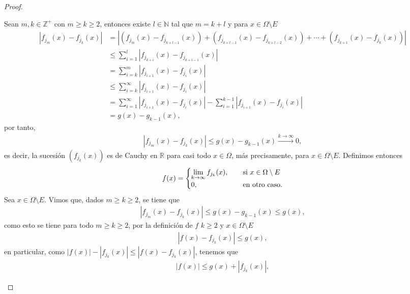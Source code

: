 \begin{proof}
\begin{itemize}
        Sean $m,k\in \mathbb{Z}^+$ con $m\geq k\geq2$, entonces existe $l\in \mathbb{N}$ tal que $m=k+l$ y para $x \in \Omega\setminus E$
        \begin{align*}
            |f_{j_m}(x)-f_{j_k}(x)|&=|(f_{j_m}(x)-f_{j_{k+l-1}}(x))+(f_{j_{k+l-1}}(x)-f_{j_{k+l-2}}(x))+\dotsb+(f_{j_{k+1}}(x)-f_{j_{k}}(x))|\\
            &\leq\sum_{i=1}^l|f_{j_{k+i}}(x)-f_{j_{k+i-1}}(x)|\\
            &=\sum_{i=k}^{m}|f_{j_{i+1}}(x)-f_{j_i}(x)|\\
            &\leq \sum_{i=k}^\infty |f_{j_{i+1}}(x)-f_{j_i}(x)|\\
            &=\sum_{i=1}^\infty |f_{j_{i+1}}(x)-f_{j_i}(x)|-\sum_{i=1}^{k-1} |f_{j_{i+1}}(x)-f_{j_i}(x)|\\
            &=g(x)-g_{k-1}(x), 
        \end{align*}
        por tanto, 
        \begin{align*}
            |f_{j_m}(x)-f_{j_k}(x)|\leq g(x)-g_{k-1}(x)\xrightarrow{k\to \infty}0,
        \end{align*}
        es decir, la sucesión $(f_{j_k}(x))$ es de Cauchy en $\mathbb{R}$ para casi todo $x \in \Omega$, más precisamente, para $x \in \Omega \setminus E$. Definimos entonces
        \begin{align*}
            f(x)=\begin{cases}
                \displaystyle\lim_{k\to \infty}f_{j_k}(x), \hspace{3mm} &\text{ si } x\in \Omega\setminus E\\
                0, &\text{ en otro caso.}
            \end{cases}
        \end{align*}
        Sea $x \in \Omega\setminus E$. Vimos que, dados $m\geq k\geq 2$, se tiene que
        \begin{align*}
            |f_{j_m}(x)-f_{j_k}(x)|\leq g(x)-g_{k-1}(x)\leq g(x),
        \end{align*}
        como esto se tiene para todo $m\geq k\geq 2$, por la definición de $f$ $k\geq 2$ y $x \in \Omega\setminus E$
        \begin{align}\label{eq: dominada}
            |f(x)-f_{j_k}(x)|\leq g(x),
        \end{align}
        en particular, como $|f(x)|-|f_{j_k}(x)|\leq |f(x)-f_{j_k}(x)|$, tenemos que
        \begin{align*}
            |f(x)|\leq g(x)+|f_{j_k}(x)|,
        \end{align*}

\end{itemize}
\end{proof}
